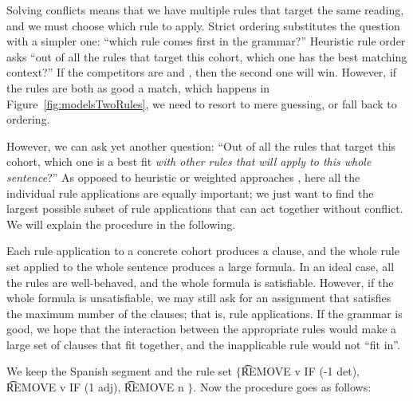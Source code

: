 Solving conflicts means that we have multiple rules that target the same reading, and we must choose which rule to apply.
Strict ordering substitutes the question with a simpler one: ``which rule comes first in the grammar?''
Heuristic rule order asks ``out of all the rules that target this cohort, which one has the best matching context?''
If the competitors are  and , then the second one will win. However, if the rules are both as good a match, which happens in Figure~\ref{fig:modelsTwoRules}, we need to resort to mere guessing, or fall back to ordering.

However, we can ask yet another question: ``Out of all the rules that target this cohort, which one is a best fit \emph{with other rules that will apply to this whole sentence}?'' 
As opposed to heuristic or weighted approaches \cite{voutilainen1994designing,oflazer97votingconstraints}, here all the individual rule applications are 
equally important; we just want to find the largest possible subset of rule applications that can act together without conflict.
We will explain the procedure in the following.

Each rule application to a concrete cohort produces a clause,
and the whole rule set applied to the whole sentence produces 
a large formula. In an ideal case, all the rules are well-behaved, 
and the whole formula is satisfiable. However, if the whole formula 
is unsatisfiable, we may still ask for an assignment that satisfies 
the maximum number of the clauses; that is, rule applications. 
If the grammar is good, we hope that the interaction between 
the appropriate rules would make a large set of clauses that 
fit together, and the inapplicable rule would not ``fit in''.


We keep the Spanish segment and the rule set $\{$\t{REMOVE v IF (-1 det)}, \t{REMOVE v IF (1 adj)}, \t{REMOVE n} $\}$.
Now the procedure goes as follows:

